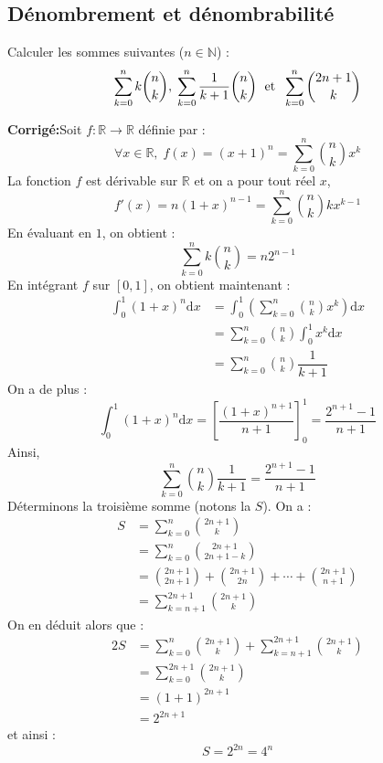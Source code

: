 \documentclass[a4paper,twoside,french,10pt]{VcCours}
\newcommand{\dx}{\text{d}x}
\newcommand{\corr}{\textbf{Corrigé:}}
\begin{document}

\tableofcontents
\separationTitre



\subsection{Dénombrement et dénombrabilité}



\begin{Exercice}{} Calculer les sommes suivantes ($n \in \mathbb{N}$) : 
$$\sum_{k=0}^n k \binom{n}{k}, \; \sum_{k=0}^n\frac{1}{k+1} \binom{n}{k} \; \hbox{ et } \; \sum_{k=0}^n \binom{2n+1}{k}$$
\end{Exercice}

\corr Soit $f : \mathbb{R} \rightarrow \mathbb{R}$ définie par :
$$ \forall x \in \mathbb{R}, \; f(x)=(x+1)^n = \sum_{k=0}^n \binom{n}{k} x^k$$
La fonction $f$ est dérivable sur $\mathbb{R}$ et on a pour tout réel $x$,
$$ f'(x) = n(1+x)^{n-1}=  \sum_{k=0}^n \binom{n}{k} k x^{k-1} $$
En évaluant en $1$, on obtient :
$$ \sum_{k=0}^n k \binom{n}{k}  = n2^{n-1}$$
En intégrant $f$ sur $[0,1]$, on obtient maintenant :
\begin{align*}
\int_0^1 (1+x)^n \dx & = \int_0^1 \left( \sum_{k=0}^n \binom{n}{k} x^k \right) \dx \\
& = \sum_{k=0}^n \binom{n}{k} \int_0^1 x^k \dx \\
& = \sum_{k=0}^n \binom{n}{k} \dfrac{1}{k+1}
\end{align*}
On a de plus :
$$ \int_0^1 (1+x)^n \dx  = \left[ \dfrac{(1+x)^{n+1}}{n+1} \right]_0^1 = \dfrac{2^{n+1}-1}{n+1}$$
Ainsi,
$$ \sum_{k=0}^n \binom{n}{k} \dfrac{1}{k+1} = \dfrac{2^{n+1}-1}{n+1}$$
Déterminons la troisième somme (notons la $S$). On a :
\begin{align*}
S & = \sum_{k=0}^{n} \binom{2n+1}{k} \\
& = \sum_{k=0}^{n} \binom{2n+1}{2n+1-k} \\
& = \binom{2n+1}{2n+1} + \binom{2n+1}{2n} + \cdots + \binom{2n+1}{n+1} \\
& = \sum_{k=n+1}^{2n+1} \binom{2n+1}{k}
\end{align*}
On en déduit alors que :
\begin{align*}
2S &  = \sum_{k=0}^{n} \binom{2n+1}{k} + \sum_{k=n+1}^{2n+1} \binom{2n+1}{k} \\
& = \sum_{k=0}^{2n+1} \binom{2n+1}{k} \\
& = (1+1)^{2n+1} \\
& = 2^{2n+1} 
\end{align*}
et ainsi :
$$  S= 2^{2n} = 4^n $$
\end{document}
